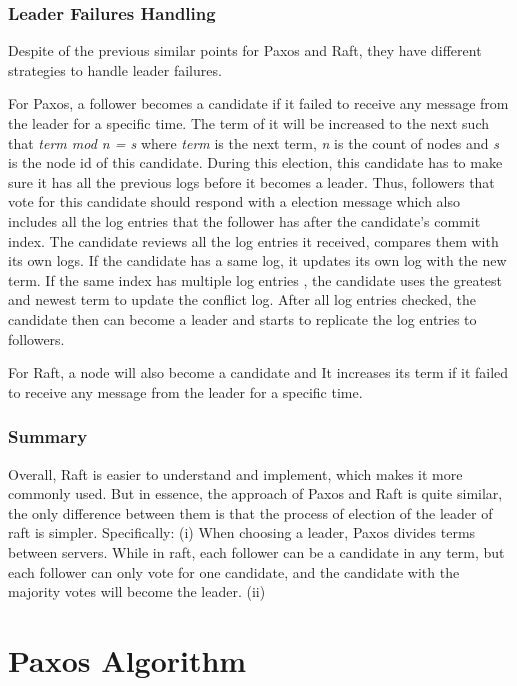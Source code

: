 \documentclass[12pt, a4paper]{article}
\begin{document}
\subsubsection{Leader Failures Handling}
Despite of the previous similar points for Paxos and Raft, they have different
strategies to handle leader failures.

For Paxos, a follower becomes a candidate if it failed to receive any message
from the leader for a specific time. 
The term of it will be increased to the next such that 
\textit{term mod n = s} where \textit{term} is the next term, 
\textit{n} is the count of nodes and \textit{s} is the node id of this candidate. 
During this election, this candidate has to make sure it has all the previous logs
before it becomes a leader. Thus, followers that vote for this candidate should respond
with a election message which also includes all the log entries that the follower
has after the candidate’s commit index.
The candidate reviews all the log entries it received, compares them with its own logs.
If the candidate has a same log, it updates its own log with the new term.
If the same index has multiple log entries , the candidate uses the 
greatest and newest term to update the conflict log.
After all log entries checked, the candidate then can become a leader
and starts to replicate the log entries to followers.

For Raft, a node will also become a candidate and It increases its term if it failed to receive any message
from the leader for a specific time. 

\subsubsection{Summary}
Overall, Raft is easier to understand and implement, which makes it more commonly used. But in essence, the approach of Paxos and Raft is quite similar, the only difference between them is that the process of election of the leader of raft is simpler. Specifically: (i) When choosing a leader, Paxos divides terms between servers. While in raft, each follower can be a candidate in any term, but each follower can only vote for one candidate, and the candidate with the majority votes will become the leader. (ii) 





\section{Paxos Algorithm} \label{sec:paxos}
\end{document}
